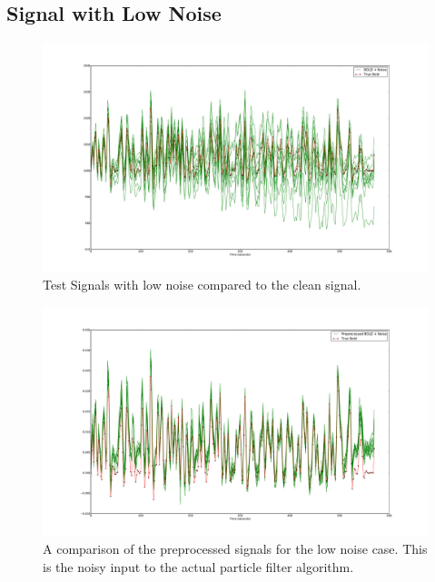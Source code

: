 \subsection{Signal with Low Noise}
\label{sec:SimLowNoise}
\begin{figure}
\includegraphics[clip=true,trim=6cm 2cm 6cm 3.5cm,width=17cm]{images/realization_lownoise}
\caption{Test Signals with low noise compared to the clean signal.}
\label{fig:LowNoiseRealization}
\end{figure}
\begin{figure}
\includegraphics[clip=true,trim=6cm 2cm 6cm 3.5cm,width=17cm]{images/preprocessed_lownoise}
\caption{A comparison of the preprocessed signals for the low noise case. This is the
noisy input to the actual particle filter algorithm.}
\label{fig:PreprocessedLowNoise}
\end{figure}

